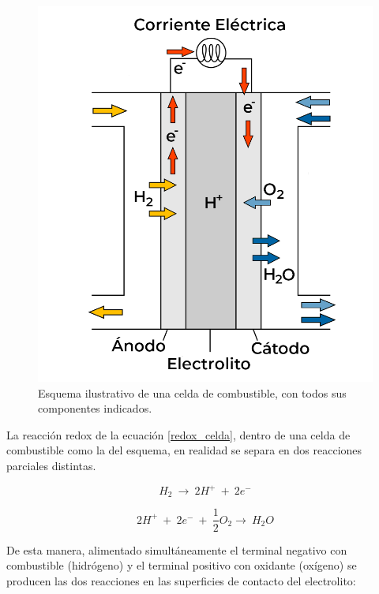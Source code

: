\begin{figure}[h]
    \centering
    \includegraphics[scale=0.25]{Imagenes/Fuel Cell.png}
    \caption{Esquema ilustrativo de una celda de combustible, con todos sus componentes indicados.}
    \label{fuel_cell}
\end{figure}

La reacción redox de la ecuación \ref{redox_celda}, dentro de una celda de combustible como la del esquema, en realidad se separa en dos reacciones parciales distintas.

\begin{equation}\label{redox_anodo}
    H_2\ \longrightarrow\ 2H^{+}\ +\ 2e^-
\end{equation}

\begin{equation}\label{redox_catodo}
    2H^{+}\ +\ 2e^-\ +\ \frac{1}{2}O_2\longrightarrow\ H_2O
\end{equation}

De esta manera, alimentado simultáneamente el terminal negativo con combustible (hidrógeno) y el terminal positivo con oxidante (oxígeno) se producen las dos reacciones en las superficies de contacto del electrolito:

